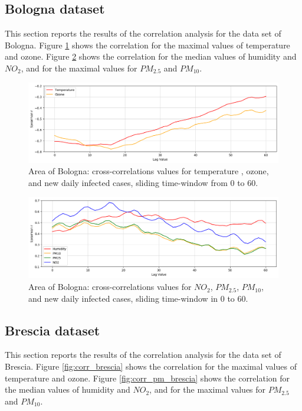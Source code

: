 \documentclass[review]{elsarticle}
\begin{document}
 \subsection{Bologna dataset}
This section reports the results of the correlation analysis for the data set of Bologna. 		Figure \ref{fig:corr_bologna} shows the correlation for the maximal values of temperature 
 and ozone.
	Figure \ref{fig:corr_pm_bologna} shows the correlation for the median values of humidity and $NO_{2}$, and for the 		maximal values for $PM_{2.5}$ and $PM_{10}$.
\begin{figure}[htp] 	\centering 	\includegraphics[width=1\linewidth]{img/corr_temp_bologna.png} 	\caption{Area of Bologna: cross-correlations values for temperature 
, ozone, 
 and new daily infected cases, sliding time-window from $0$ to $60$.} 	\label{fig:corr_bologna} \end{figure} 
 \begin{figure}[htp]	\centering	\includegraphics[width=1\linewidth]{img/corr_pm_bologna.png}	\caption{Area of Bologna: cross-correlations values for $NO_{2}$, $PM_{2.5}$, $PM_{10}$, and new daily infected cases, sliding time-window in $0$ to $60$.}	\label{fig:corr_pm_bologna} \end{figure}
\newpage \subsection{Brescia dataset}
This section reports the results of the correlation analysis for the data set of Brescia. 		Figure \ref{fig:corr_brescia} shows the correlation for the maximal values of temperature 
 and ozone.
	Figure \ref{fig:corr_pm_brescia} shows the correlation for the median values of humidity and $NO_{2}$, and for the 		maximal values for $PM_{2.5}$ and $PM_{10}$.
\end{document}
